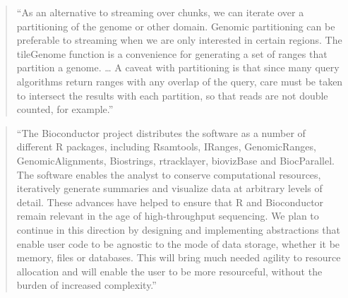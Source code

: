 \documentclass[]{tufte-book}
\begin{document}
\begin{quote}
``As an alternative to streaming over chunks, we can iterate over a
partitioning of the genome or other domain. Genomic partitioning can be
preferable to streaming when we are only interested in certain regions. The
tileGenome function is a convenience for generating a set of ranges that
partition a genome. \ldots{} A caveat with partitioning is that since many query
algorithms return ranges with any overlap of the query, care must be taken to
intersect the results with each partition, so that reads are not double counted,
for example.'' \citep{lawrence2014scalable}
\end{quote}

\begin{quote}
``The Bioconductor project distributes the software as a number of different R
packages, including Rsamtools, IRanges, GenomicRanges, GenomicAlignments,
Biostrings, rtracklayer, biovizBase and BiocParallel. The software enables the
analyst to conserve computational resources, iteratively generate summaries and
visualize data at arbitrary levels of detail. These advances have helped to
ensure that R and Bioconductor remain relevant in the age of high-throughput
sequencing. We plan to continue in this direction by designing and implementing
abstractions that enable user code to be agnostic to the mode of data storage,
whether it be memory, files or databases. This will bring much needed agility to
resource allocation and will enable the user to be more resourceful, without the
burden of increased complexity.'' \citep{lawrence2014scalable}
\end{quote}
\end{document}
